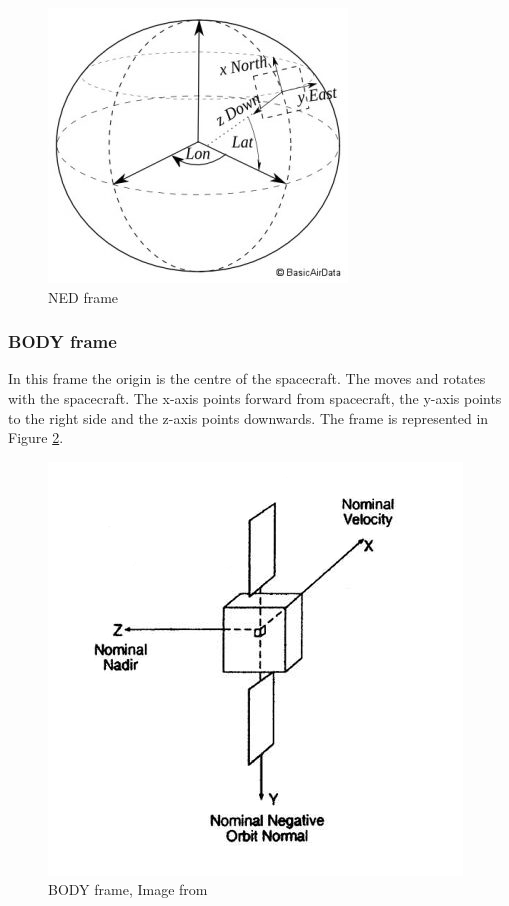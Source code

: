 \documentclass[12pt,a4paper,oneside]{article}
\begin{document}
\begin{figure}[!htb]
\includegraphics[scale=0.6]{ned_frame.jpg}
\centering
\caption{NED frame \cite{ned-frame-image}}
\label{fig:ned_frame}
\end{figure}

\subsubsection{BODY frame}
In this frame the origin is the centre of the spacecraft. The moves and rotates with the spacecraft. The x-axis points forward from spacecraft, the y-axis points to the right side and the z-axis points downwards. The frame is represented in Figure \ref{fig:body_frame}.

\begin{figure}[!htb]
\includegraphics[scale=0.5]{body_frame.jpg}
\centering
\caption{BODY frame, Image from \citet{larson1992space}}
\label{fig:body_frame}
\end{figure}
\end{document}

